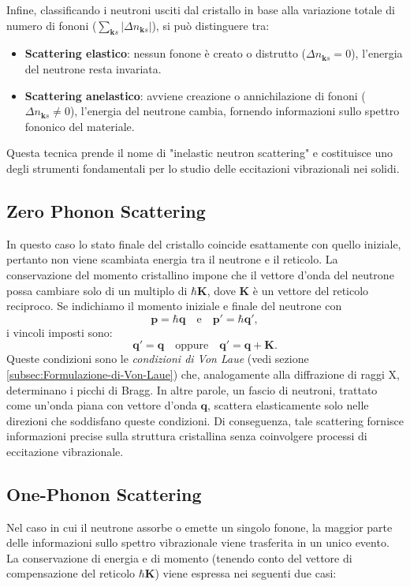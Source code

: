 Infine, classificando i neutroni usciti dal cristallo in base alla variazione totale di numero di fononi ($\sum_{\mathbf{k}s} |\Delta n_{\mathbf{k}s}|$), si può distinguere tra:
\begin{itemize}
    \item \textbf{Scattering elastico}: nessun fonone è creato o distrutto ($\Delta n_{\mathbf{k}s} = 0$), l'energia del neutrone resta invariata.
    \item \textbf{Scattering anelastico}: avviene creazione o annichilazione di fononi ($\Delta n_{\mathbf{k}s} \neq 0$), l'energia del neutrone cambia, fornendo informazioni sullo spettro fononico del materiale.
\end{itemize}
Questa tecnica prende il nome di "inelastic neutron scattering" e costituisce uno degli strumenti fondamentali per lo studio delle eccitazioni vibrazionali nei solidi.
\subsection{Zero Phonon Scattering}
In questo caso lo stato finale del cristallo coincide esattamente con quello iniziale, pertanto non viene scambiata energia tra il neutrone e il reticolo. La conservazione del momento cristallino impone che il vettore d'onda del neutrone possa cambiare solo di un multiplo di $\hbar\mathbf{K}$, dove $\mathbf{K}$ è un vettore del reticolo reciproco. Se indichiamo il momento iniziale e finale del neutrone con 
\[
\mathbf{p} = \hbar \mathbf{q} \quad \text{e} \quad \mathbf{p}' = \hbar \mathbf{q}',
\]
i vincoli imposti sono:
\[
\mathbf{q}' = \mathbf{q} \quad \text{oppure} \quad \mathbf{q}' = \mathbf{q} + \mathbf{K}.
\]
Queste condizioni sono le \emph{condizioni di Von Laue} (vedi sezione \ref{subsec:Formulazione-di-Von-Laue}) che, analogamente alla diffrazione di raggi X, determinano i picchi di Bragg. In altre parole, un fascio di neutroni, trattato come un'onda piana con vettore d'onda $\mathbf{q}$, scattera elasticamente solo nelle direzioni che soddisfano queste condizioni. Di conseguenza, tale scattering fornisce informazioni precise sulla struttura cristallina senza coinvolgere processi di eccitazione vibrazionale.

\subsection{One-Phonon Scattering}
Nel caso in cui il neutrone assorbe o emette un singolo fonone, la maggior parte delle informazioni sullo spettro vibrazionale viene trasferita in un unico evento. La conservazione di energia e di momento (tenendo conto del vettore di compensazione del reticolo $\hbar\mathbf{K}$) viene espressa nei seguenti due casi:

